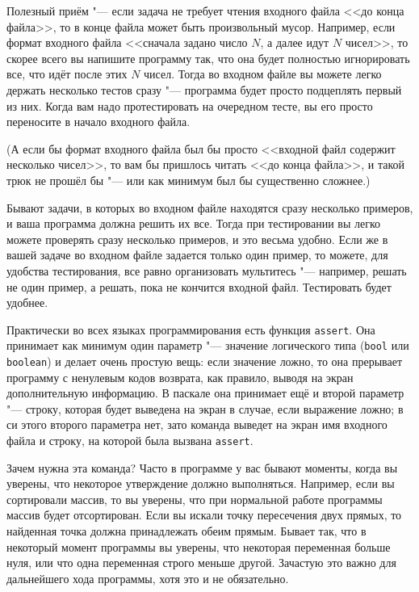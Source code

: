 Полезный приём "--- если задача не требует чтения входного файла <<до конца файла>>, то в конце файла может быть произвольный мусор. 
Например, если формат входного файла <<сначала задано число $N$, а далее идут $N$ чисел>>, то скорее всего вы напишите программу так, 
что она будет полностью игнорировать все, что идёт после этих $N$ чисел. 
Тогда во входном файле вы можете легко держать несколько тестов сразу "--- программа будет просто подцеплять первый из них. 
Когда вам надо протестировать на очередном тесте, вы его просто переносите в начало входного файла.

(А если бы формат входного файла был бы просто <<входной файл содержит несколько чисел>>, то вам бы пришлось читать <<до конца файла>>, и такой трюк не прошёл бы
"--- или как минимум был бы существенно сложнее.)

Бывают задачи, в которых во входном файле находятся сразу несколько примеров, и ваша программа должна решить их все. 
Тогда при тестировании вы легко можете проверять сразу несколько примеров, и это весьма удобно. 
Если же в вашей задаче во входном файле задается только один пример, то можете, для удобства тестирования, 
все равно организовать мультитесь "--- например, решать не один пример, а решать, пока не кончится входной файл.
Тестировать будет удобнее.

Практически во всех языках программирования есть функция \verb`assert`. 
Она принимает как минимум один параметр "--- значение логического типа (\verb`bool` или \verb`boolean`) и делает очень простую вещь:
если значение ложно, то она прерывает программу с ненулевым кодов возврата, как правило, выводя на экран дополнительную информацию.
В паскале она принимает ещё и второй параметр "--- строку, которая будет выведена на экран в случае, если выражение ложно; в си этого второго параметра нет,
зато команда выведет на экран имя входного файла и строку, на которой была вызвана \verb`assert`.

Зачем нужна эта команда? 
Часто в программе у вас бывают моменты, когда вы уверены, что некоторое утверждение должно выполняться.
Например, если вы сортировали массив, то вы уверены, что при нормальной работе программы массив будет отсортирован.
Если вы искали точку пересечения двух прямых, то найденная точка должна принадлежать обеим прямым. 
Бывает так, что в некоторый момент программы вы уверены, что некоторая переменная больше нуля, или
что одна переменная строго меньше другой. Зачастую это важно для дальнейшего хода программы, хотя это и не обязательно.

